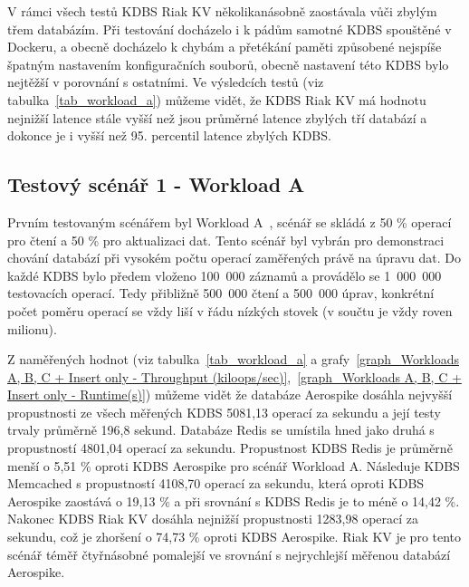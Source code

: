 \documentclass[czech,master,dept460,male,csharp,cpdeclaration]{diploma}
\begin{document}
	V rámci všech testů KDBS Riak KV několikanásobně zaostávala vůči zbylým třem databázím. Při testování docházelo i k pádům samotné KDBS spouštěné v Dockeru, a obecně docházelo k chybám a přetékání paměti způsobené nejspíše špatným nastavením konfiguračních souborů, obecně nastavení této KDBS bylo nejtěžší v porovnání s ostatními. Ve výsledcích testů (viz tabulka~\ref{tab_workload_a}) můžeme vidět, že KDBS Riak KV má hodnotu nejnižší latence stále vyšší než jsou průměrné latence zbylých tří databází a dokonce je i vyšší než 95. percentil latence zbylých KDBS.
	
	\subsection{Testový scénář 1 - Workload A}
	
	Prvním testovaným scénářem byl Workload A~\cite{workloads}, scénář se skládá z 50 \% operací pro čtení a 50 \% pro aktualizaci dat. Tento scénář byl vybrán pro demonstraci chování databází při vysokém počtu operací zaměřených právě na úpravu dat. Do každé KDBS bylo předem vloženo 100~000 záznamů a provádělo se 1~000~000 testovacích operací. Tedy přibližně 500~000 čtení a 500~000 úprav, konkrétní počet poměru operací se vždy liší v řádu nízkých stovek (v součtu je vždy roven milionu).
	
	Z naměřených hodnot (viz tabulka~\ref{tab_workload_a} a grafy~\ref{graph_Workloads A, B, C + Insert only - Throughput (kiloops/sec)},~\ref{graph_Workloads A, B, C + Insert only - Runtime(s)}) můžeme vidět že databáze Aerospike dosáhla nejvyšší propustnosti ze všech měřených KDBS 5081,13 operací za sekundu a její testy trvaly průměrně 196,8 sekund. Databáze Redis se umístila hned jako druhá s propustností 4801,04 operací za sekundu. Propustnost KDBS Redis je průměrně menší o 5,51 \% oproti KDBS Aerospike pro scénář Workload A. Následuje KDBS Memcached s propustností 4108,70 operací za sekundu, která oproti KDBS Aerospike zaostává o 19,13 \% a při srovnání s KDBS Redis je to méně o 14,42 \%. Nakonec KDBS Riak KV dosáhla nejnižší propustnosti 1283,98 operací za sekundu, což je zhoršení o 74,73 \% oproti KDBS Aerospike. Riak KV je pro tento scénář téměř čtyřnásobné pomalejší ve srovnání s nejrychlejší měřenou databází Aerospike.
	
\end{document}
